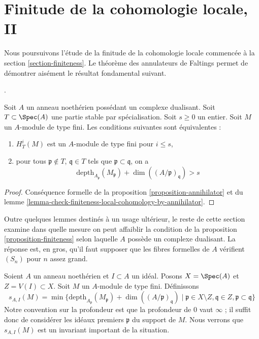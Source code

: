 \section{Finitude de la cohomologie locale, II}
\label{section-finiteness-II}

\noindent
Nous poursuivons l'étude de la finitude de la cohomologie locale commencée à la section \ref{section-finiteness}. Le théorème des annulateurs de Faltings permet de démontrer aisément le résultat fondamental suivant.

\begin{proposition}
\label{proposition-finiteness}
\begin{reference}
\cite{Faltings-annulators}.
\end{reference}
Soit $A$ un anneau noethérien possédant un complexe dualisant. Soit $T \subset \Spec(A)$ une partie stable par spécialisation. Soit $s \geq 0$ un entier. Soit $M$ un $A$-module de type fini. Les conditions suivantes sont équivalentes :
\begin{enumerate}
\item $H^i_T(M)$ est un $A$-module de type fini pour $i \leq s$,
\item pour tous $\mathfrak p \not \in T$, $\mathfrak q \in T$ tels que $\mathfrak p \subset \mathfrak q$, on a
$$
\text{depth}_{A_\mathfrak p}(M_\mathfrak p) +
\dim((A/\mathfrak p)_\mathfrak q) > s
$$
\end{enumerate}
\end{proposition}

\begin{proof}
Conséquence formelle de la proposition \ref{proposition-annihilator} et du lemme \ref{lemma-check-finiteness-local-cohomology-by-annihilator}.
\end{proof}

\noindent
Outre quelques lemmes destinés à un usage ultérieur, le reste de cette section examine dans quelle mesure on peut affaiblir la condition de la proposition \ref{proposition-finiteness} selon laquelle $A$ possède un complexe dualisant. La réponse est, en gros, qu'il faut supposer que les fibres formelles de $A$ vérifient $(S_n)$ pour $n$ assez grand.

\medskip\noindent
Soient $A$ un anneau noethérien et $I \subset A$ un idéal. Posons $X = \Spec(A)$ et $Z = V(I) \subset X$. Soit $M$ un $A$-module de type fini. Définissons
\begin{equation}
\label{equation-cutoff}
s_{A, I}(M) =
\min \{
\text{depth}_{A_\mathfrak p}(M_\mathfrak p) + \dim((A/\mathfrak p)_\mathfrak q)
\mid
\mathfrak p \in X \setminus Z, \mathfrak q \in Z,
\mathfrak p \subset \mathfrak q
\}
\end{equation}
Notre convention sur la profondeur est que la profondeur de $0$ vaut $\infty$ ; il suffit donc de considérer les idéaux premiers $\mathfrak p$ du support de $M$. Nous verrons que $s_{A, I}(M)$ est un invariant important de la situation.

